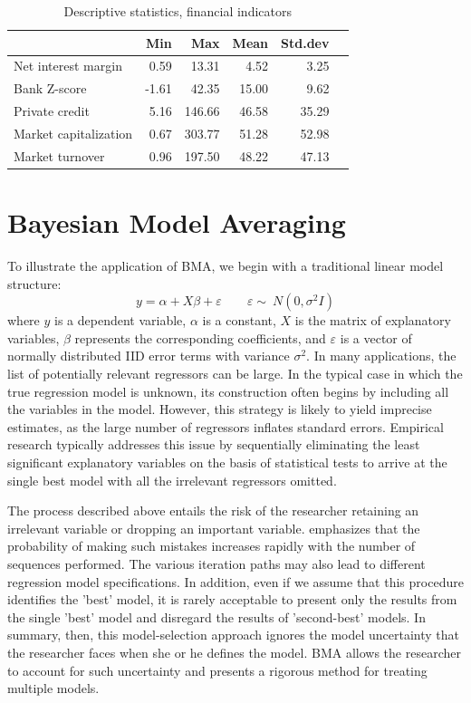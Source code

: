 \begin{refsection}
\begin{table}[!ht]
	\caption{Descriptive statistics, financial indicators}
	\label{tab:descstat}
	\centering
	\begin{tabular}{lrrrrr}
		\toprule
		& Min & Max & Mean & Std.dev \\ 
		\midrule
		Net interest margin 		& 0.59 & 13.31 & 4.52 & 3.25 \\ 
		Bank Z-score				& -1.61 & 42.35 & 15.00 & 9.62 \\ 
		Private credit 			& 5.16 & 146.66 & 46.58 & 35.29 \\ 
		Market capitalization 	& 0.67 & 303.77 & 51.28 & 52.98 \\ 
		Market turnover 			& 0.96 & 197.50 & 48.22 & 47.13 \\ 
		\bottomrule
		
	\end{tabular}
\end{table}

\section{Bayesian Model Averaging}
\label{ch2sec:BMA}
To illustrate the application of BMA, we begin with a traditional linear model structure:
%
\begin{equation}\label{ch2eq:OLS}
	y = \alpha + X\beta+ \varepsilon \qquad \varepsilon  \sim\ N(0, \sigma^{2}I)
\end{equation}
%
where $y$ is a dependent variable, $\alpha$ is a constant, $X$ is the matrix of explanatory variables, $\beta$ represents the corresponding coefficients, and $\varepsilon$ is a vector of normally distributed IID error terms with variance $\sigma^{2}$. In many applications, the list of potentially relevant regressors can be large. In the typical case in which the true regression model is unknown, its construction often begins by including all the variables in the model. However, this strategy is likely to yield imprecise estimates, as the large number of regressors inflates standard errors. Empirical research typically addresses this issue by sequentially eliminating the least significant explanatory variables on the basis of statistical tests to arrive at the single best model with all the irrelevant regressors omitted.

The process described above entails the risk of the researcher retaining an irrelevant variable or dropping an important variable. \textcite{Koop2003} emphasizes that the probability of making such mistakes increases rapidly with the number of sequences performed. The various iteration paths may also lead to different regression model specifications. In addition, even if we assume that this procedure identifies the 'best' model, it is rarely acceptable to present only the results from the single 'best' model and disregard the results of 'second-best' models. In summary, then, this model-selection approach ignores the model uncertainty that the researcher faces when she or he defines the model. \ac{BMA} allows the researcher to account for such uncertainty and presents a rigorous method for treating multiple models.


\end{refsection}
